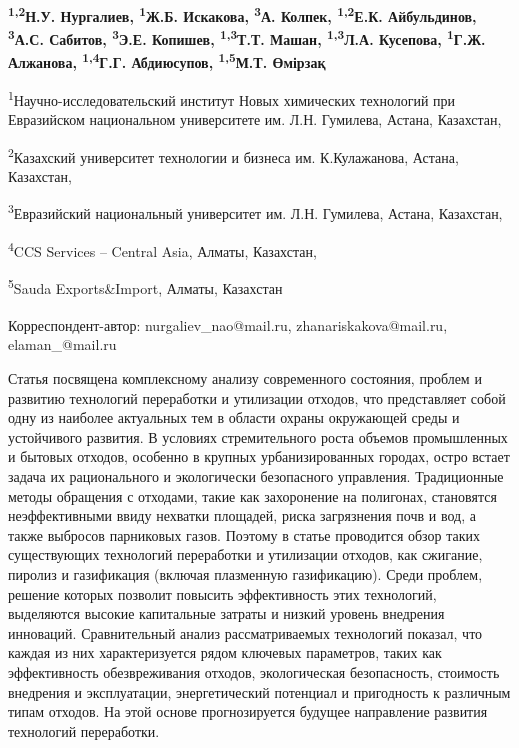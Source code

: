 
\begin{articleheader}

{\bfseries
\textsuperscript{1,2}Н.У. Нургалиев\textsuperscript{\envelope },
\textsuperscript{1}Ж.Б. Искакова\textsuperscript{\envelope },
\textsuperscript{3}А. Колпек,
\textsuperscript{1,2}Е.К. Айбульдинов\textsuperscript{\envelope },
\textsuperscript{3}А.С. Сабитов,
\textsuperscript{3}Э.Е. Копишев,
\textsuperscript{1,3}Т.Т. Машан,
\textsuperscript{1,3}Л.А. Кусепова,
\textsuperscript{1}Г.Ж. Алжанова,
\textsuperscript{1,4}Г.Г. Абдиюсупов,
\textsuperscript{1,5}М.Т. Өмірзақ
}
\end{articleheader}

\begin{affiliation}
\textsuperscript{1}Научно-исследовательский институт Новых химических технологий при Евразийском национальном университете им. Л.Н. Гумилева, Астана, Казахстан,

\textsuperscript{2}Казахский университет технологии и бизнеса им. К.Кулажанова, Астана, Казахстан,

\textsuperscript{3}Евразийский национальный университет им. Л.Н. Гумилева, Астана, Казахстан,

\textsuperscript{4}CCS Services -- Central Asia, Алматы, Казахстан,

\textsuperscript{5}Sauda Exports\&Import, Алматы, Казахстан

\raggedright \textsuperscript{\envelope }Корреспондент-автор: nurgaliev\_nao@mail.ru, zhanariskakova@mail.ru, elaman\_@mail.ru
\end{affiliation}

Статья посвящена комплексному анализу современного состояния, проблем и
развитию технологий переработки и утилизации отходов, что представляет
собой одну из наиболее актуальных тем в области охраны окружающей среды
и устойчивого развития. В условиях стремительного роста объемов
промышленных и бытовых отходов, особенно в крупных урбанизированных
городах, остро встает задача их рационального и экологически безопасного
управления. Традиционные методы обращения с отходами, такие как
захоронение на полигонах, становятся неэффективными ввиду нехватки
площадей, риска загрязнения почв и вод, а также выбросов парниковых
газов. Поэтому в статье проводится обзор таких существующих технологий
переработки и утилизации отходов, как сжигание, пиролиз и газификация
(включая плазменную газификацию). Среди проблем, решение которых
позволит повысить эффективность этих технологий, выделяются высокие
капитальные затраты и низкий уровень внедрения инноваций. Сравнительный
анализ рассматриваемых технологий показал, что каждая из них
характеризуется рядом ключевых параметров, таких как эффективность
обезвреживания отходов, экологическая безопасность, стоимость внедрения
и эксплуатации, энергетический потенциал и пригодность к различным типам
отходов. На этой основе прогнозируется будущее направление развития
технологий переработки.

